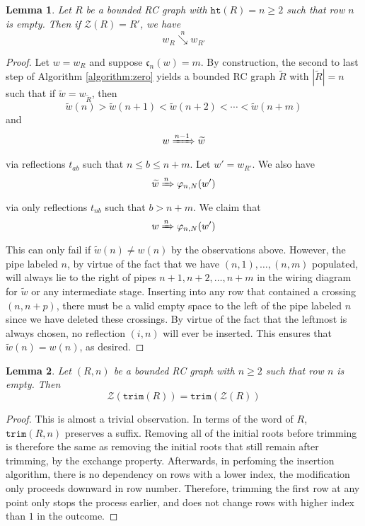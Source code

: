 \documentclass{amsart}
\newtheorem{lemma}{Lemma}[subsection]
\theoremstyle{definition}
\theoremstyle{remark}
\numberwithin{equation}{subsection}
\newcommand{\downvar}[1]{\stackrel{#1}{\searrow}}
\newcommand{\wof}[1]{w_{#1}}
\newcommand{\Tom}[1]{\xRightarrow{#1}}
\newcommand{\trm}{\mathtt{trim}}
\newcommand{\zeromap}{\mathcal{Z}}
\newcommand{\hr}{\mathtt{ht}}
\newcommand{\code}{\mathfrak{c}}
\begin{document}
\begin{lemma} \label{lemma:zerotransition}
Let $R$ be a bounded RC graph with $\hr(R)=n\geq 2$ such that row $n$ is empty. Then if $\zeromap(R) = R'$, we have
$$\wof{R}\downvar{n} \wof{R'}$$
\end{lemma}
\begin{proof}
Let $w=\wof{R}$ and suppose $\code_n(w) = m$. By construction, the second to last step of Algorithm \ref{algorithm:zero} yields a bounded RC graph $\widetilde{R}$ with $|\widetilde{R}|=n$ such that if $\widetilde{w} = \wof{\widetilde{R}}$, then
$$\widetilde{w}(n) > \widetilde{w}(n+1) < \widetilde{w}(n+2) < \cdots < \widetilde{w}(n + m)$$
and
$$w\Tom{n-1}\widetilde{w}$$
via reflections $t_{ab}$ such that $n\leq b\leq n+m$. Let $w' = \wof{R'}$. We also have
$$\widetilde{w}\Tom{n}\varphi_{n, N}(w')$$
via only reflections $t_{nb}$ such that $b>n+m$. We claim that
$$w\Tom{n} \varphi_{n, N}(w')$$
This can only fail if $\widetilde{w}(n)\neq w(n)$ by the observations above. However, the pipe labeled $n$, by virtue of the fact that we have $(n,1),\ldots,(n,m)$ populated, will always lie to the right of pipes $n+1,n+2,\ldots,n+m$ in the wiring diagram for $\widetilde{w}$ or any intermediate stage. Inserting into any row that contained a crossing $(n, n+p)$, there must be a valid empty space to the left of the pipe labeled $n$ since we have deleted these crossings. By virtue of the fact that the leftmost is always chosen, no reflection $(i,n)$ will ever be inserted. This ensures that $\widetilde{w}(n) = w(n)$, as desired.
\end{proof}


\begin{lemma} \label{lemma:ztrim}
Let $(R, n)$ be a bounded RC graph with $n\geq 2$ such that row $n$ is empty. Then
$$\zeromap(\trm(R)) = \trm(\zeromap(R))$$
\end{lemma}
\begin{proof}
This is almost a trivial observation. In terms of the word of $R$, $\trm(R, n)$ preserves a suffix. Removing all of the initial roots before trimming is therefore the same as removing the initial roots that still remain after trimming, by the exchange property. Afterwards, in perfoming the insertion algorithm, there is no dependency on rows with a lower index, the modification only proceeds downward in row number. Therefore, trimming the first row at any point only stops the process earlier, and does not change rows with higher index than $1$ in the outcome.
\end{proof}
\end{document}
